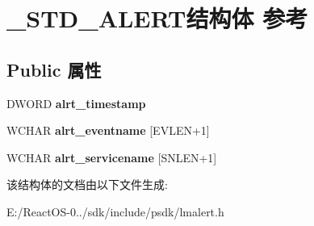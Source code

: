\hypertarget{struct___s_t_d___a_l_e_r_t}{}\section{\+\_\+\+S\+T\+D\+\_\+\+A\+L\+E\+R\+T结构体 参考}
\label{struct___s_t_d___a_l_e_r_t}
\subsection*{Public 属性}
\begin{DoxyCompactItemize}
\item 
\mbox{\label{struct___s_t_d___a_l_e_r_t_ac63d196a042cbce8798ba8130bd56148}} 
D\+W\+O\+RD {\bfseries alrt\+\_\+timestamp}
\item 
\mbox{\label{struct___s_t_d___a_l_e_r_t_a226797f42e3c1ab9b27b09c22e004620}} 
W\+C\+H\+AR {\bfseries alrt\+\_\+eventname} \mbox{[}E\+V\+L\+EN+1\mbox{]}
\item 
\mbox{\label{struct___s_t_d___a_l_e_r_t_a5a5237564a5917ce9787e7c275856156}} 
W\+C\+H\+AR {\bfseries alrt\+\_\+servicename} \mbox{[}S\+N\+L\+EN+1\mbox{]}
\end{DoxyCompactItemize}


该结构体的文档由以下文件生成\+:\begin{DoxyCompactItemize}
\item 
E\+:/\+React\+O\+S-\/0../sdk/include/psdk/lmalert.\+h\end{DoxyCompactItemize}
